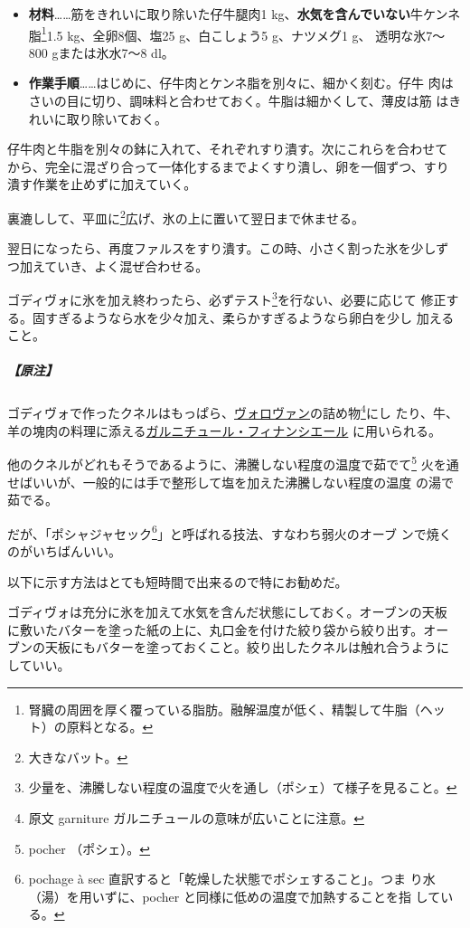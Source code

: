 \begin{recette}
\begin{itemize}
\item
  \textbf{材料}\ldots{}\ldots{}筋をきれいに取り除いた仔牛腿肉1
  kg、\textbf{水気を含んでいない}牛ケンネ脂\footnote{腎臓の周囲を厚く覆っている脂肪。融解温度が低く、精製して牛脂（ヘッ
    ト）の原料となる。}1.5 kg、全卵8個、塩25 g、白こしょう5 g、ナツメグ1
  g、 透明な氷7〜800 gまたは氷水7〜8 dl。
\item
  \textbf{作業手順}\ldots{}\ldots{}はじめに、仔牛肉とケンネ脂を別々に、細かく刻む。仔牛
  肉はさいの目に切り、調味料と合わせておく。牛脂は細かくして、薄皮は筋
  はきれいに取り除いておく。
\end{itemize}

仔牛肉と牛脂を別々の鉢に入れて、それぞれすり潰す。次にこれらを合わせて
から、完全に混ざり合って一体化するまでよくすり潰し、卵を一個ずつ、すり
潰す作業を止めずに加えていく。

裏漉しして、平皿に\footnote{大きなバット。}広げ、氷の上に置いて翌日まで休ませる。

翌日になったら、再度ファルスをすり潰す。この時、小さく割った氷を少しず
つ加えていき、よく混ぜ合わせる。

ゴディヴォに氷を加え終わったら、必ずテスト\footnote{少量を、沸騰しない程度の温度で火を通し（ポシェ）て様子を見ること。}を行ない、必要に応じて
修正する。固すぎるようなら水を少々加え、柔らかすぎるようなら卵白を少し
加えること。

\hypertarget{nota-godiveau-a}{%
\subparagraph{【原注】}\label{nota-godiveau-a}}

ゴディヴォで作ったクネルはもっぱら、\protect\hyperlink{vol-au-vent}{ヴォロヴァン}の詰め物\footnote{原文
  garniture ガルニチュールの意味が広いことに注意。}にし
たり、牛、羊の塊肉の料理に添える\protect\hyperlink{garniture-financiere}{ガルニチュール・フィナンシエール}
に用いられる。

他のクネルがどれもそうであるように、沸騰しない程度の温度で茹でて\footnote{pocher
  （ポシェ）。}
火を通せばいいが、一般的には手で整形して塩を加えた沸騰しない程度の温度
の湯で茹でる。

だが、「ポシャジャセック\footnote{pochage à sec
  直訳すると「乾燥した状態でポシェすること」。つま
  り水（湯）を用いずに、pocher と同様に低めの温度で加熱することを指
  している。}」と呼ばれる技法、すなわち弱火のオーブ
ンで焼くのがいちばんいい。

以下に示す方法はとても短時間で出来るので特にお勧めだ。

ゴディヴォは充分に氷を加えて水気を含んだ状態にしておく。オーブンの天板
に敷いたバターを塗った紙の上に、丸口金を付けた絞り袋から絞り出す。オー
ブンの天板にもバターを塗っておくこと。絞り出したクネルは触れ合うように
していい。


\end{recette}
